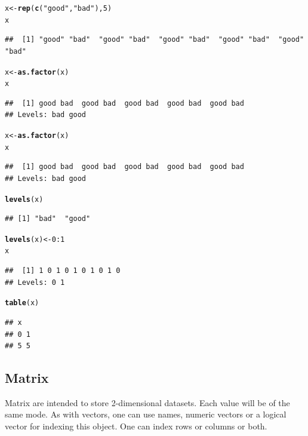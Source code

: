 \documentclass[10pt]{article}\usepackage[]{graphicx}\usepackage[]{color}
\makeatletter
\newcommand{\hlnum}[1]{\textcolor[rgb]{0.686,0.059,0.569}{#1}}%
\newcommand{\hlstr}[1]{\textcolor[rgb]{0.192,0.494,0.8}{#1}}%
\newcommand{\hlopt}[1]{\textcolor[rgb]{0,0,0}{#1}}%
\newcommand{\hlstd}[1]{\textcolor[rgb]{0.345,0.345,0.345}{#1}}%
\newcommand{\hlkwb}[1]{\textcolor[rgb]{0.69,0.353,0.396}{#1}}%
\newcommand{\hlkwd}[1]{\textcolor[rgb]{0.737,0.353,0.396}{\textbf{#1}}}%
\newenvironment{kframe}{%
 \def\at@end@of@kframe{}%
 \ifinner\ifhmode%
  \def\at@end@of@kframe{\end{minipage}}%
  \begin{minipage}{\columnwidth}%
 \fi\fi%
 \def\FrameCommand##1{\hskip\@totalleftmargin \hskip-\fboxsep
 \colorbox{shadecolor}{##1}\hskip-\fboxsep
     \hskip-\linewidth \hskip-\@totalleftmargin \hskip\columnwidth}%
 \MakeFramed {\advance\hsize-\width
   \@totalleftmargin\z@ \linewidth\hsize
   \@setminipage}}%
 {\par\unskip\endMakeFramed%
 \at@end@of@kframe}
\newenvironment{knitrout}{}{} %
\makeatother
\begin{document}
\begin{knitrout}
\color{fgcolor}\begin{kframe}
\begin{alltt}
\hlstd{x} \hlkwb{<-} \hlkwd{rep}\hlstd{(}\hlkwd{c}\hlstd{(}\hlstr{"good"}\hlstd{,}\hlstr{"bad"}\hlstd{),}\hlnum{5}\hlstd{)}
\hlstd{x}
\end{alltt}
\begin{verbatim}
##  [1] "good" "bad"  "good" "bad"  "good" "bad"  "good" "bad"  "good" "bad"
\end{verbatim}
\begin{alltt}
\hlstd{x} \hlkwb{<-} \hlkwd{as.factor}\hlstd{(x)}
\hlstd{x}
\end{alltt}
\begin{verbatim}
##  [1] good bad  good bad  good bad  good bad  good bad 
## Levels: bad good
\end{verbatim}
\begin{alltt}
\hlstd{x} \hlkwb{<-} \hlkwd{as.factor}\hlstd{(x)}
\hlstd{x}
\end{alltt}
\begin{verbatim}
##  [1] good bad  good bad  good bad  good bad  good bad 
## Levels: bad good
\end{verbatim}
\begin{alltt}
\hlkwd{levels}\hlstd{(x)}
\end{alltt}
\begin{verbatim}
## [1] "bad"  "good"
\end{verbatim}
\begin{alltt}
\hlkwd{levels}\hlstd{(x)} \hlkwb{<-} \hlnum{0}\hlopt{:}\hlnum{1}
\hlstd{x}
\end{alltt}
\begin{verbatim}
##  [1] 1 0 1 0 1 0 1 0 1 0
## Levels: 0 1
\end{verbatim}
\begin{alltt}
\hlkwd{table}\hlstd{(x)}
\end{alltt}
\begin{verbatim}
## x
## 0 1 
## 5 5
\end{verbatim}
\end{kframe}
\end{knitrout}
\medskip
\subsection{Matrix}
Matrix are intended to store 2-dimensional datasets. Each value will be of the same mode. As with vectors, one can use names, numeric vectors or a logical vector for indexing this object. One can index rows or columns or both.
\end{document}
